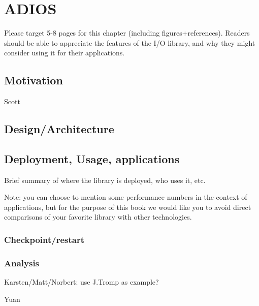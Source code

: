 
\chapter{ADIOS}
\label{part3-ch5-adios}
{\color {red}Please target 5-8 pages for this chapter (including figures+references). Readers should be able to appreciate the features of the I/O library, and why they might consider using it for their applications.}


\section{Motivation}
{\color {red}Scott}




\section{Design/Architecture}




\section{Deployment, Usage, applications}
{\color {red}Brief summary of where the library is deployed, who uses it, etc.

Note: you can choose to mention some performance numbers in the context of applications, but for the purpose of this book we would like you to avoid direct comparisons of your favorite library with other technologies.  }


\subsection{Checkpoint/restart}



\subsection{Analysis}
{\color {red}Karsten/Matt/Norbert: use J.Tromp as example?}

{\color {red}Yuan}



